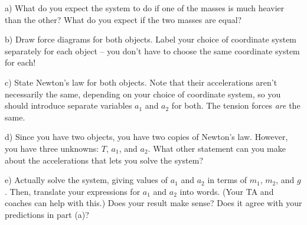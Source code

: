 \documentclass[12pt]{article}
\begin{document}
		a) What do you expect the system to do if one of the masses is much heavier than the other? What do you expect if the
		two masses are equal?
		
		\vspace{1in}
		
		b) Draw force diagrams for both objects. Label your choice of coordinate system separately for each object -- you don't have to choose the same coordinate system for each!
		
		\vspace{2in}
		
		c) State Newton's law for both objects. Note that their accelerations aren't necessarily the same, depending on your choice of coordinate system, so you should introduce separate variables $a_1$ and $a_2$ for both. The tension forces
		{\it are} the same.
		
		\newpage
		
		d) Since you have two objects, you have two copies of Newton's law. However, you have three unknowns: $T$, $a_1$, and $a_2$. What other statement can you make about the accelerations that lets you solve the system?
		
		\vspace{3in}
		
		e) Actually solve the system, giving values of $a_1$ and $a_2$ in terms of $m_1$, $m_2$, and $g$. Then, translate
		your expressions for $a_1$ and $a_2$ into words. (Your TA and coaches can help with this.) Does your result make sense?
		Does it agree with your predictions in part (a)?
		
	
\end{document}
